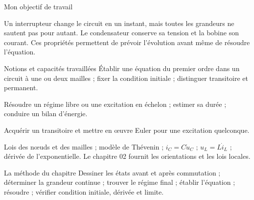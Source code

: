 \thispagestyle{mpsiFront}
\begin{docu}{Mon objectif de travail}\end{docu}

Un interrupteur change le circuit en un instant, mais toutes les grandeurs ne sautent pas pour autant. Le condensateur conserve sa tension et la bobine son courant. Ces propriétés permettent de prévoir l’évolution avant même de résoudre l’équation.
\begin{loi}{Notions et capacités travaillées}
Établir une équation du premier ordre dans un circuit à une ou deux mailles ; fixer la condition initiale ; distinguer transitoire et permanent.\par Résoudre un régime libre ou une excitation en échelon ; estimer sa durée ; conduire un bilan d’énergie.\par Acquérir un transitoire et mettre en œuvre Euler pour une excitation quelconque.
\end{loi}

Lois des nœuds et des mailles ; modèle de Thévenin ; $i_C=C\dot u_C$ ; $u_L=L\dot i_L$ ; dérivée de l’exponentielle. Le chapitre 02 fournit les orientations et les lois locales.

\begin{methode}{La méthode du chapitre}
Dessiner les états avant et après commutation ; déterminer la grandeur continue ; trouver le régime final ; établir l’équation ; résoudre ; vérifier condition initiale, dérivée et limite.
\end{methode}

